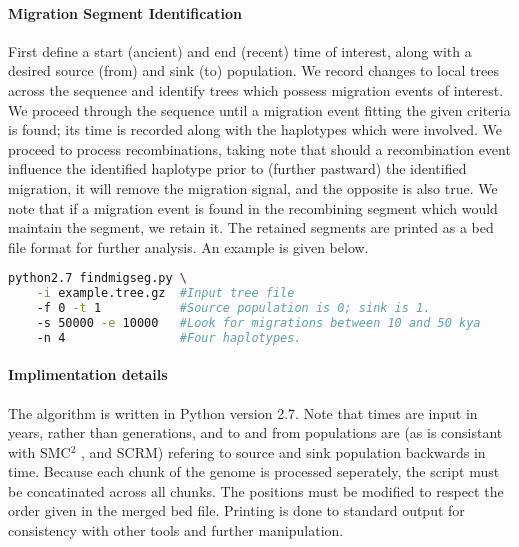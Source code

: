 \documentclass[a4paper]{article}
\def\SMC{SMC$^2$ }
\begin{document}
\paragraph{Migration Segment Identification} First define a start (ancient) and end (recent) time of interest, along with a desired source (from) and sink (to) population.  We record changes to local trees across the sequence and identify trees which possess migration events of interest. We proceed through the sequence until a migration event fitting the given criteria is found; its time is recorded along with the haplotypes which were involved. We proceed to process recombinations, taking note that should a recombination event influence the identified haplotype prior to (further pastward) the identified migration, it will remove the migration signal, and the opposite is also true. We note that if a migration event is found in the recombining segment which would maintain the segment, we retain it. The retained segments are printed as a bed file format for further analysis. An example is given below.


\begin{lstlisting}[xleftmargin=0.1\textwidth, caption={Example usage of findmigseg.py}, captionpos={b}, language=bash]
python2.7 findmigseg.py \
	-i example.tree.gz 	#Input tree file
	-f 0 -t 1 			#Source population is 0; sink is 1.
	-s 50000 -e 10000 	#Look for migrations between 10 and 50 kya
	-n 4 				#Four haplotypes.
\end{lstlisting}

\paragraph{Implimentation details} The algorithm is written in Python version 2.7. Note that times are input in years, rather than generations, and to and from populations are (as is consistant with \SMC, and SCRM) refering to source and sink population backwards in time. Because each chunk of the genome is processed seperately, the script must be concatinated across all chunks. The positions must be modified to respect the order given in the merged bed file. Printing is done to standard output for consistency with other tools and further manipulation.
\end{document}
